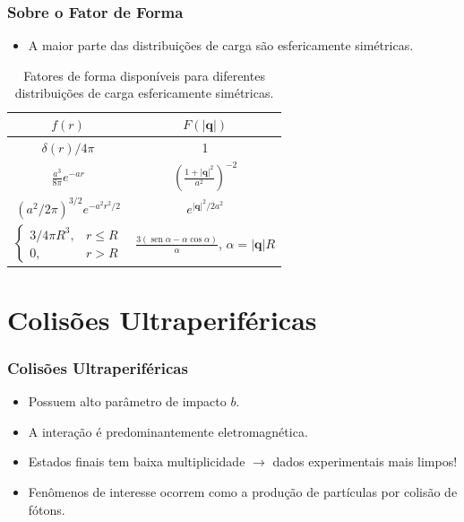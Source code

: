 \documentclass[xcolor=dvipsnames]{beamer}
\DeclareMathOperator*{\sen}{sen}
\renewcommand{\vec}{\mathbf}
\begin{document}
\begin{frame}
	\frametitle{Sobre o Fator de Forma}
	\begin{itemize}
		\item A maior parte das distribuições de carga são esfericamente
			simétricas.
	\end{itemize}
	\begin{table}
		\begin{tabular}{|c|c|}
			\hline 
			$f(r)$ & $F(|\vec{q}|)$ \\
			\hline
			 $\delta (r) / 4 \pi$ & 1 \\
			$\displaystyle \frac{a^3}{8\pi} e^{-ar}$ &
			$\displaystyle \left(\frac{1 + |\vec{q}|^2}{a^2}\right) ^{-2}$\\
			$ \left( a^2 / 2\pi \right)^{3/2} e
			^{-a^2 r^2 / 2}$ & $e^{|\vec{q}|^2 / 2a^2 }$ \\
			 $\displaystyle \begin{cases}
				3/4\pi R^3, & r \leq R \\
				0, & r > R
			\end{cases}$ & $ \displaystyle \frac{3(\sen \alpha - \alpha \cos
			\alpha)}{\alpha}$, $\alpha = |\vec{q}| R$ 
			\\
			\hline
		\end{tabular}
		\caption{Fatores de forma disponíveis para diferentes distribuições de
		carga esfericamente simétricas.}
	\end{table}
\end{frame}


\section{Colisões Ultraperiféricas}
\begin{frame}
	\frametitle{Colisões Ultraperiféricas}
	\begin{itemize}
		\item Possuem alto parâmetro de impacto $b$.
		\item A interação é predominantemente eletromagnética.
		\item Estados finais tem baixa multiplicidade $\rightarrow$ dados
			experimentais mais limpos!
		\item Fenômenos de interesse ocorrem como a produção de partículas por
			colisão de fótons.
	\end{itemize}
\end{frame}
\end{document}
